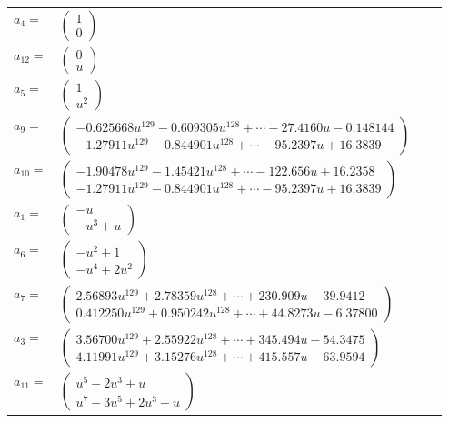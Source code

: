 \documentclass[1p]{elsarticle_modified}
\theoremstyle{definition}
\begin{document}
\begin{tabular}{m{7pt} m{180pt} m{7pt} m{180pt} }
\flushright $a_{4}=$&$\begin{pmatrix}1\\0\end{pmatrix}$ \\
\flushright $a_{12}=$&$\begin{pmatrix}0\\u\end{pmatrix}$ \\
\flushright $a_{5}=$&$\begin{pmatrix}1\\u^2\end{pmatrix}$ \\
\flushright $a_{9}=$&$\begin{pmatrix}-0.625668 u^{129}-0.609305 u^{128}+\cdots-27.4160 u-0.148144\\-1.27911 u^{129}-0.844901 u^{128}+\cdots-95.2397 u+16.3839\end{pmatrix}$ \\
\flushright $a_{10}=$&$\begin{pmatrix}-1.90478 u^{129}-1.45421 u^{128}+\cdots-122.656 u+16.2358\\-1.27911 u^{129}-0.844901 u^{128}+\cdots-95.2397 u+16.3839\end{pmatrix}$ \\
\flushright $a_{1}=$&$\begin{pmatrix}- u\\- u^3+u\end{pmatrix}$ \\
\flushright $a_{6}=$&$\begin{pmatrix}- u^2+1\\- u^4+2 u^2\end{pmatrix}$ \\
\flushright $a_{7}=$&$\begin{pmatrix}2.56893 u^{129}+2.78359 u^{128}+\cdots+230.909 u-39.9412\\0.412250 u^{129}+0.950242 u^{128}+\cdots+44.8273 u-6.37800\end{pmatrix}$ \\
\flushright $a_{3}=$&$\begin{pmatrix}3.56700 u^{129}+2.55922 u^{128}+\cdots+345.494 u-54.3475\\4.11991 u^{129}+3.15276 u^{128}+\cdots+415.557 u-63.9594\end{pmatrix}$ \\
\flushright $a_{11}=$&$\begin{pmatrix}u^5-2 u^3+u\\u^7-3 u^5+2 u^3+u\end{pmatrix}$ \\

\end{tabular}
\end{document}
